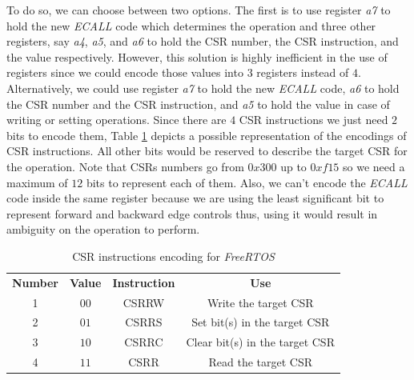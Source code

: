 To do so, we can choose between two options. The first is to use register \textit{a7}
to hold the new \textit{ECALL} code which determines the operation and three other
registers, say \textit{a4}, \textit{a5}, and \textit{a6} to hold the CSR number,
the CSR instruction, and the value respectively. However, this solution is highly
inefficient in the use of registers since we could encode those values into $3$ registers
instead of $4$. Alternatively, we could use register \textit{a7} to hold the new
\textit{ECALL} code, \textit{a6} to hold the CSR number and the CSR instruction,
and \textit{a5} to hold the value in case of writing or setting operations.
Since there are $4$ CSR instructions we just need $2$ bits to encode them, Table
\ref{tab:instructionenc} depicts a possible representation of the encodings of CSR
instructions. All other bits would be reserved to describe the target CSR for
the operation. Note that CSRs numbers go from $0x300$ up to $0xf15$ so we need a
maximum of $12$ bits to represent each of them. Also, we can't encode the \textit{ECALL}
code inside the same register because we are using the least significant bit to
represent forward and backward edge controls thus, using it would result in ambiguity
on the operation to perform.

\begin{table}
  \centering
  \begin{tabular}{|c|c|c|c|}
    \hline
    \textbf{Number} & \textbf{Value} & \textbf{Instruction} & \textbf{Use}                   \\
    \hhline{====} 1 & $00$           & CSRRW                & Write the target CSR           \\
    \hline
    2               & $01$           & CSRRS                & Set bit(s) in the target CSR   \\
    \hline
    3               & $10$           & CSRRC                & Clear bit(s) in the target CSR \\
    \hline
    4               & $11$           & CSRR                 & Read the target CSR            \\
    \hline
  \end{tabular}
  \caption{CSR instructions encoding for \textit{FreeRTOS}}
  \label{tab:instructionenc}
\end{table}

